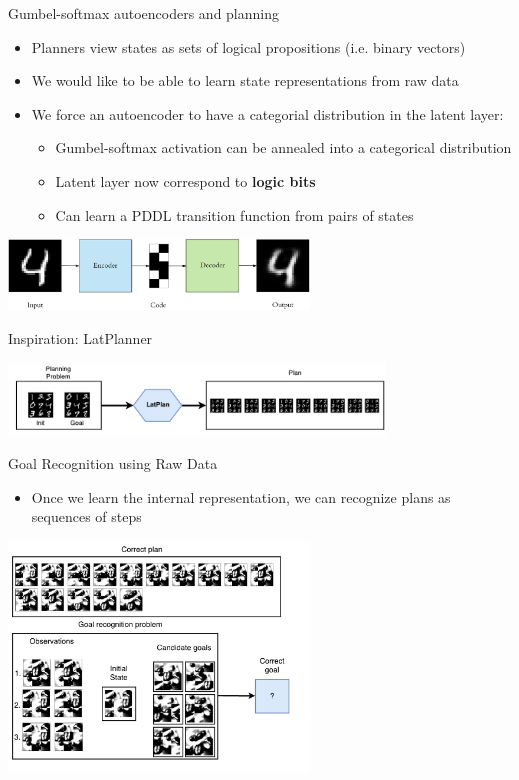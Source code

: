 \documentclass[usenames,dvipsnames]{beamer}
\begin{document}
\begin{frame}[c]{Gumbel-softmax autoencoders and planning}
	\begin{itemize}
		\item Planners view states as sets of logical propositions (i.e. binary vectors)
		\item We would like to be able to learn state representations from raw data
		\item We force an autoencoder to have a categorial distribution in the latent layer:
		\begin{itemize}
			\item Gumbel-softmax activation can be annealed into a categorical distribution
			\item Latent layer now correspond to \textbf{logic bits}
			\item Can learn a PDDL transition function from pairs of states
		\end{itemize}
	\end{itemize}
	\begin{center}
		\includegraphics[width=8cm]{fig/cat-autoencoder.png}
	\end{center}
\end{frame}

\begin{frame}[c]{Inspiration: LatPlanner}
	\begin{center}
		\includegraphics[width=10cm]{fig/latplan.pdf}
	\end{center}
\end{frame}

\begin{frame}[c]{Goal Recognition using Raw Data}
	\begin{itemize}
		\item Once we learn the internal representation, we can recognize plans as sequences of steps
	\end{itemize}
	\begin{center}
		\includegraphics[width=8cm]{fig/problem_representation.pdf}
	\end{center}
\end{frame}
\end{document}

